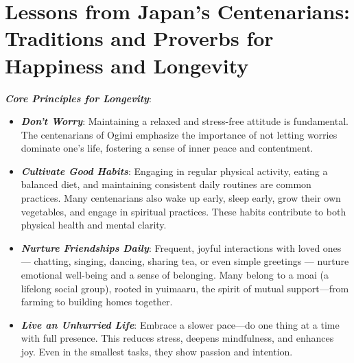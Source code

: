 \section*{Lessons from Japan's Centenarians: Traditions and Proverbs for Happiness and Longevity}
\textbf{\textit{Core Principles for Longevity}}:
\begin{itemize}
    \item \textbf{\textit{Don't Worry}}: Maintaining a relaxed and stress-free attitude is fundamental. The centenarians of Ogimi emphasize the importance of not letting worries dominate one's life, fostering a sense of inner peace and contentment.
    \item \textbf{\textit{Cultivate Good Habits}}: Engaging in regular physical activity, eating a balanced diet, and maintaining consistent daily routines are common practices. Many centenarians also wake up early, sleep early, grow their own vegetables, and engage in spiritual practices. These habits contribute to both physical health and mental clarity.
    \item \textbf{\textit{Nurture Friendships Daily}}: Frequent, joyful interactions with loved ones — chatting, singing, dancing, sharing tea, or even simple greetings — nurture emotional well-being and a sense of belonging. Many belong to a moai (a lifelong social group), rooted in yuimaaru, the spirit of mutual support—from farming to building homes together.
    \item \textbf{\textit{Live an Unhurried Life}}: Embrace a slower pace—do one thing at a time with full presence. This reduces stress, deepens mindfulness, and enhances joy. Even in the smallest tasks, they show passion and intention.
\end{itemize}
